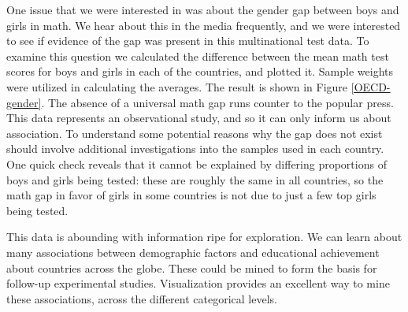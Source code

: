 \documentclass[11pt]{article}
\begin{document}
One issue that we were interested in was about the gender gap between boys and girls in math. We hear about this in the media frequently, and we were interested to see if evidence of the gap was present in this multinational test data. To examine this question we calculated the difference between the mean math test scores for boys and girls in each of the countries, and plotted it. Sample weights were utilized in calculating the averages. The result is shown in Figure \ref{OECD-gender}. The absence of a universal math gap runs counter to the popular press. This data represents an observational study, and so it can only inform us about association. To understand some potential reasons why the gap does not exist should involve additional investigations into the samples used in each country. One quick check reveals that it cannot be explained by differing proportions of boys and girls being tested: these are roughly the same in all countries, so the math gap in favor of girls in some countries is not due to just a few top girls being tested.

This data is abounding with information ripe for exploration. We can learn about many associations between demographic factors and educational achievement about countries across the globe. These could be mined to form the basis for follow-up experimental studies. Visualization provides an excellent way to mine these associations, across the different categorical levels.
\end{document}
